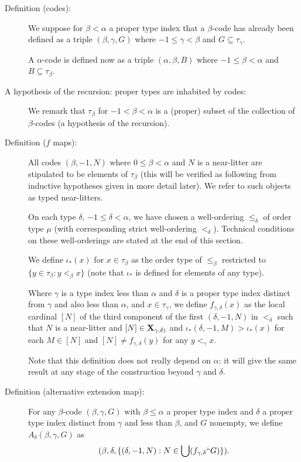\documentclass[112pt]{article}
\begin{document}
\begin{description}
\item[Definition (codes):]  We suppose for $\beta<\alpha$ a proper type index that a $\beta$-code has already been defined as a triple $(\beta,\gamma,G)$ where $-1 \leq \gamma<\beta$ and $G \subseteq \tau_{\gamma}$. 

A $\alpha$-code is defined now as a triple $(\alpha,\beta,B)$ where $-1 \leq \beta<\alpha$ and $B \subseteq \tau_{\beta}$.   

\item[A hypothesis of the recursion:  proper types are inhabited by codes:]

We remark that $\tau_\beta$ for $-1<\beta<\alpha$  is a (proper) subset of the collection of $\beta$-codes (a hypothesis of the recursion).

\item[Definition ($f$ maps):]  All codes $(\beta,-1,N)$ where $0\leq \beta<\alpha$ and $N$ is a near-litter are stipulated to be elements of $\tau_\beta$ (this will be verified as following from inductive hypotheses given in more detail later).   We refer to such objects as typed near-litters. 

 On each type $\delta$, $-1 \leq \delta <\alpha$, we have chosen a well-ordering $\leq_\delta$ of order type $\mu$ (with corresponding strict well-ordering $<_\delta$).  Technical conditions on these well-orderings are stated at the end of this section.

   We define $\iota_*(x)$ for $x \in \tau_\beta$ as the order type of $\leq_\beta$ restricted to $\{y \in \tau_\beta:y <_\beta x\}$ (note that $\iota_*$ is defined for elements of any type).

   Where $\gamma$ is a type index less than $\alpha$ and $\delta$ is a proper type index distinct from $\gamma$ and also less than $\alpha$, and $x \in \tau_\gamma$, we define $f_{\gamma,\delta}(x)$ as the local cardinal $[N]$ of the third component of the first $(\delta,-1,N)$ in $<_\delta$ such that $N$ is a near-litter and $[N] \in {\bf X}_{\gamma,\delta)}$ and $\iota_*(\delta,-1,M)>\iota_*(x)$  for each $M \in [N]$ and $[N] \neq f_{\gamma,\delta}(y)$ for any $y <_\gamma x$.  

Note that this definition does not really depend on $\alpha$:  it will give the same result at any stage of the construction beyond $\gamma$ and $\delta$.

\item[Definition (alternative extension map):]  For any $\beta$-code $(\beta,\gamma,G)$ with $\beta \leq \alpha$ a proper type index and $\delta$ a proper type index distinct from $\gamma$ and less than $\beta$, and $G$ nonempty, we define
$A_\delta(\beta,\gamma,G)$ as $$(\beta,\delta,\{(\delta,-1,N):N \in \bigcup (f_{\gamma,\delta}``G)\}).$$


\end{description}
\end{document}
